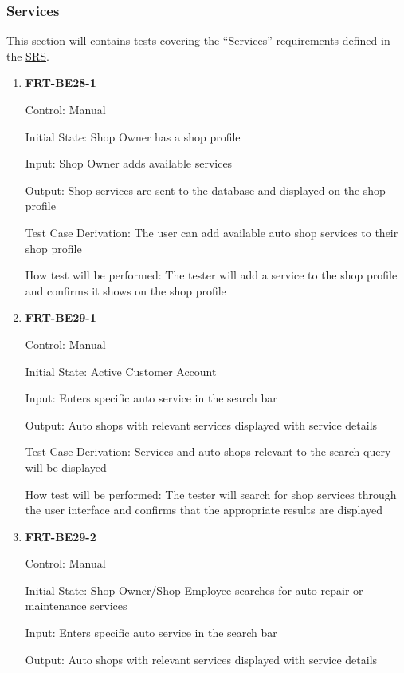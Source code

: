 \documentclass[12pt, titlepage]{article}
\begin{document}
\subsubsection{Services}

This section will contains tests covering the ``Services'' requirements defined in the
\href{https://github.com/arkinmodi/project-sayyara/blob/main/docs/SRS/SRS.pdf}{SRS}.

\begin{enumerate}

	\item \textbf{FRT-BE28-1}

	      Control: Manual

	      Initial State: Shop Owner has a shop profile

	      Input: Shop Owner adds available services

	      Output: Shop services are sent to the database and displayed on the shop profile

	      Test Case Derivation: The user can add available auto shop services to their shop profile

	      How test will be performed: The tester will add a service to the shop profile and confirms it shows
	      on the shop profile

	\item \textbf{FRT-BE29-1}

	      Control: Manual

	      Initial State: Active Customer Account

	      Input: Enters specific auto service in the search bar

	      Output: Auto shops with relevant services displayed with service details

	      Test Case Derivation: Services and auto shops relevant to the search query will be displayed

	      How test will be performed: The tester will search for shop services through the user interface and
	      confirms that the appropriate results are displayed

	\item \textbf{FRT-BE29-2}

	      Control: Manual

	      Initial State: Shop Owner/Shop Employee searches for auto repair or maintenance services

	      Input: Enters specific auto service in the search bar

	      Output: Auto shops with relevant services displayed with service details


\end{enumerate}
\end{document}

